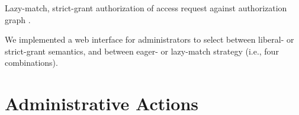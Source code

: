 \documentclass{acm_proc_article-sp}
\begin{document}
\begin{algorithm}[t]
\;
\caption{Lazy-match, strict-grant authorization of access
request  against authorization graph \label{algo-strict}.}
\end{algorithm}

We implemented a web interface for administrators to select between
liberal- or strict-grant semantics, and between eager- or
lazy-match strategy (i.e., four combinations).


\begin{comment}
One may ask why we
keep the eager-match strategy in our implementation. That is because
some of our planned future extensions may work only when the
eager-match strategy is adopted.  One example is that if we are to
incorporate negative permissions and conflict resolution into future
versions, then a lazy-match strategy is not compatible.  We anticipate
that in future versions of our implementation, we will develop code
for selecting the matching strategy based on what access control
features are configured for the system.
\end{comment}

\section{Administrative Actions}
\label{sec-admin}
\end{document}
